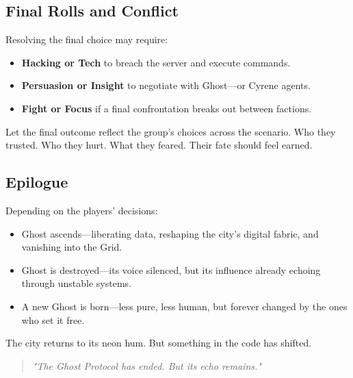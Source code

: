 \documentclass[nodeprecatedcode,bg=print]{dndbook}
\begin{document}
\begin{multicols}{2}
\subsection*{Final Rolls and Conflict}

Resolving the final choice may require:
\begin{itemize}
    \item \textbf{Hacking or Tech} to breach the server and execute commands.
    \item \textbf{Persuasion or Insight} to negotiate with Ghost—or Cyrene agents.
    \item \textbf{Fight or Focus} if a final confrontation breaks out between factions.
\end{itemize}

Let the final outcome reflect the group’s choices across the scenario. Who they trusted. Who they hurt. What they feared. Their fate should feel earned.

\subsection*{Epilogue}

Depending on the players’ decisions:
\begin{itemize}
    \item Ghost ascends—liberating data, reshaping the city’s digital fabric, and vanishing into the Grid.
    \item Ghost is destroyed—its voice silenced, but its influence already echoing through unstable systems.
    \item A new Ghost is born—less pure, less human, but forever changed by the ones who set it free.
\end{itemize}

The city returns to its neon hum. But something in the code has shifted.

\vspace{0.5\baselineskip}
\begin{quote}
    \textit{"The Ghost Protocol has ended. But its echo remains."}
\end{quote}



\end{multicols}
\end{document}
